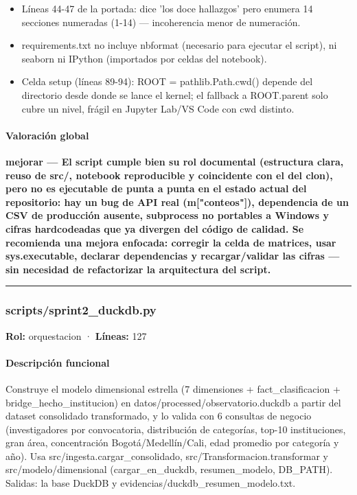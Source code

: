 \begin{tcolorbox}[riesgo]
\begin{itemize}
\begin{lstlisting}
Validación documentada de calidad de los datos del padrón de investigadores
reconocidos. La decisión metodológica adoptada se documenta de forma explícita
para que cualquier auditor pueda reproducirla y discutirla.
[...]
\end{lstlisting}

  \item Líneas 44-47 de la portada: dice 'los doce hallazgos' pero enumera 14 secciones numeradas (1-14) --- incoherencia menor de numeración.
  \item requirements.txt no incluye nbformat (necesario para ejecutar el script), ni seaborn ni IPython (importados por celdas del notebook).
  \item Celda setup (líneas 89-94): ROOT = pathlib.Path.cwd() depende del directorio desde donde se lance el kernel; el fallback a ROOT.parent solo cubre un nivel, frágil en Jupyter Lab/VS Code con cwd distinto.
\end{itemize}
\end{tcolorbox}

\paragraph{Valoración global}
\textbf{mejorar --- El script cumple bien su rol documental (estructura clara, reuso de src/, notebook reproducible y coincidente con el del clon), pero no es ejecutable de punta a punta en el estado actual del repositorio: hay un bug de API real (m["conteos"]), dependencia de un CSV de producción ausente, subprocess no portables a Windows y cifras hardcodeadas que ya divergen del código de calidad. Se recomienda una mejora enfocada: corregir la celda de matrices, usar sys.executable, declarar dependencias y recargar/validar las cifras --- sin necesidad de refactorizar la arquitectura del script.}

\medskip
\hrule

\subsubsection{scripts/sprint2\_duckdb.py}
\textbf{Rol:} orquestacion · \textbf{Líneas:} 127

\paragraph{Descripción funcional}
Construye el modelo dimensional estrella (7 dimensiones + fact\_clasificacion + bridge\_hecho\_institucion) en datos/processed/observatorio.duckdb a partir del dataset consolidado transformado, y lo valida con 6 consultas de negocio (investigadores por convocatoria, distribución de categorías, top-10 instituciones, gran área, concentración Bogotá/Medellín/Cali, edad promedio por categoría y año). Usa src/ingesta.cargar\_consolidado, src/Transformacion.transformar y src/modelo/dimensional (cargar\_en\_duckdb, resumen\_modelo, DB\_PATH). Salidas: la base DuckDB y evidencias/duckdb\_resumen\_modelo.txt.

